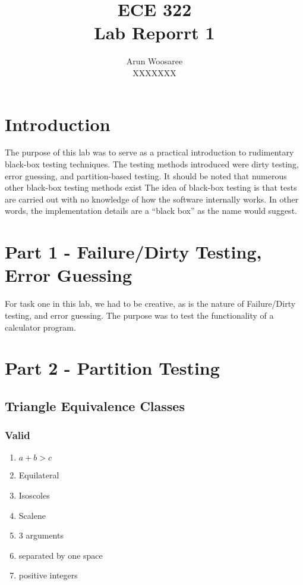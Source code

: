 \documentclass[letterpaper]{article}
\title{ECE 322 \\
Lab Reporrt 1}
\author{Arun Woosaree\\
XXXXXXX}
\begin{document}
 \maketitle 

 \section*{Introduction}
 The purpose of this lab was to serve as a practical introduction to rudimentary black-box testing techniques.
 The testing methods introduced were dirty testing, error guessing, and partition-based testing.
 It should be noted that numerous other black-box testing methods exist
 The idea of black-box testing is that tests are carried out with no knowledge of how the software
 internally works. In other words, the implementation details are a ``black box'' as the name would suggest.

\section*{Part 1 - Failure/Dirty Testing, Error Guessing}
For task one in this lab, we had to be creative, as is the nature of Failure/Dirty testing, and error guessing.
The purpose was to test the functionality of a calculator program.

\section*{Part 2 - Partition Testing}

\subsection*{Triangle Equivalence Classes}
\subsubsection*{Valid}
\begin{enumerate}
    \item $a + b > c$
    \item Equilateral
    \item Isoscoles
    \item Scalene
    \item 3 arguments
    \item separated by one space
    \item positive integers
\end{enumerate}
\end{document}
